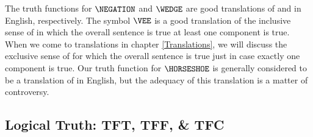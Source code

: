 The truth functions for $\NEGATION$ and $\WEDGE$ are good translations of  and  in English, respectively.  The symbol $\VEE$ is a good translation of the inclusive sense of  in which the overall sentence is true \Iff at least one component is true.  When we come to translations in chapter \ref{Translations}, we will discuss the exclusive sense of  for which the overall sentence is true just in case exactly one component is true. Our truth function for $\HORSESHOE$ is generally considered to be a translation of  in English, but the adequacy of this translation is a matter of controversy. 

\subsection{Logical Truth: TFT, TFF, \& TFC}\label{TFT TFF TFI}

